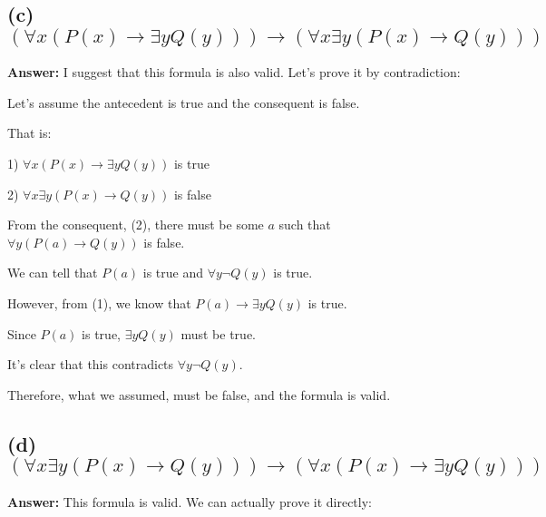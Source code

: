 \documentclass{article}
\begin{document}
\subsection*{(c) $(\forall x (P(x) \rightarrow \exists y Q(y))) \rightarrow (\forall x \exists y (P(x) \rightarrow Q(y)))$}


\textbf{Answer:} I suggest that this formula is also valid. Let's prove it by contradiction:

\vspace{1em}
Let's assume the antecedent is true and the consequent is false.

\vspace{1em}

That is:

\vspace{1em}
1) $\forall x (P(x) \rightarrow \exists y Q(y))$ is true

\vspace{1em}
2) $\forall x \exists y (P(x) \rightarrow Q(y))$ is false

\vspace{1em}
From the consequent, (2), there must be some $a$ such that $\forall y (P(a) \rightarrow Q(y))$ is false.

\vspace{1em}
We can tell that $P(a)$ is true and $\forall y \neg Q(y)$ is true.

\vspace{1em}
However, from (1), we know that $P(a) \rightarrow \exists y Q(y)$ is true.

\vspace{1em}
Since $P(a)$ is true, $\exists y Q(y)$ must be true.

\vspace{1em}
It's clear that this contradicts $\forall y \neg Q(y)$.

\vspace{1em}
Therefore, what we assumed, must be false, and the formula is valid.

\newpage


\subsection*{(d) $(\forall x \exists y (P(x) \rightarrow Q(y))) \rightarrow (\forall x (P(x) \rightarrow \exists y Q(y)))$}

\vspace{1em}

\vspace{1em}
\textbf{Answer:} This formula is valid. We can actually prove it directly:
\end{document}
